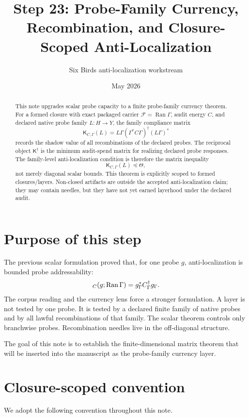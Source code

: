 \documentclass[11pt]{article}
\title{Step 23: Probe-Family Currency, Recombination, and Closure-Scoped Anti-Localization}
\author{Six Birds anti-localization workstream}
\date{May 2026}
\newcommand{\Ran}{\operatorname{Ran}}
\let\Cap\relax
\newcommand{\Cap}{\operatorname{Cap}}
\begin{document}
\maketitle

\begin{abstract}
This note upgrades scalar probe capacity to a finite probe-family currency theorem.
For a formed closure with exact packaged carrier $\mathcal F=\Ran\Gamma$, audit energy $C$, and declared native probe family $L:H\to Y$, the family compliance matrix
\[
        \mathsf K_{C,\Gamma}(L)=L\Gamma(\Gamma^*C\Gamma)^\dagger (L\Gamma)^*
\]
records the shadow value of all recombinations of the declared probes.  The reciprocal object $\mathsf K^\dagger$ is the minimum audit-spend matrix for realizing declared probe responses.  The family-level anti-localization condition is therefore the matrix inequality
\[
        \mathsf K_{C,\Gamma}(L)\preceq \Theta,
\]
not merely diagonal scalar bounds.  This theorem is explicitly scoped to formed closures/layers.  Non-closed artifacts are outside the accepted anti-localization claim; they may contain needles, but they have not yet earned layerhood under the declared audit.
\end{abstract}

\section{Purpose of this step}
The previous scalar formulation proved that, for one probe $g$, anti-localization is bounded probe addressability:
\[
        \Cap_C(g;\Ran\Gamma)=g_\Gamma^*C_\Gamma^\dagger g_\Gamma.
\]
The corpus reading and the currency lens force a stronger formulation.  A layer is not tested by one probe.  It is tested by a declared finite family of native probes and by all lawful recombinations of that family.  The scalar theorem controls only branchwise probes.  Recombination needles live in the off-diagonal structure.

The goal of this note is to establish the finite-dimensional matrix theorem that will be inserted into the manuscript as the probe-family currency layer.

\section{Closure-scoped convention}
We adopt the following convention throughout this note.
\end{document}
